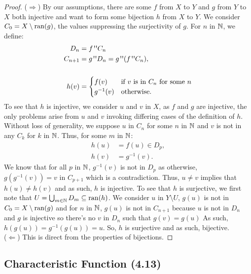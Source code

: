 \begin{proof}
    ($\Longrightarrow$) By our assumptions, there are some 
    $f$ from $X$ to $Y$ and $g$ from $Y$ to $X$ both
    injective and want to form some bijection $h$ from $X$ to $Y$.
    We consider $C_0 = X \setminus \operatorname{ran}(g)$, the values suppressing
    the surjectivity of $g$. For $n$ in $\mathbb{N}$, we define: \begin{align*}
        D_{n}     &= f \fran C_n \\
        C_{n + 1} &= g \fran D_n = g \fran (f \fran C_n), \\
        \\
        h(v) &= \begin{cases}
            f(v) & \text{if $v$ is in $C_n$ for some $n$} \\
            g^{-1}(v) & \text{otherwise.}
        \end{cases}
    \end{align*} To see that $h$ is injective, we consider $u$ and $v$ in
    $X$, as $f$ and $g$ are injective, the only problems arise from
    $u$ and $v$ invoking differing cases of the definition of $h$.
    Without loss of generality, we suppose $u$ in $C_n$ for some $n$ in $\mathbb{N}$
    and $v$ is not in any $C_k$ for $k$ in $\mathbb{N}$. Thus, for some
    $m$ in $\mathbb{N}$: \begin{align*}
        h(u) &= f(u) \in D_p, \\
        h(v) &= g^{-1}(v).
    \end{align*} We know that for all $p$ in $\mathbb{N}$, $g^{-1}(v)$ is not in $D_p$ 
    as otherwise, $g(g^{-1}(v)) = v$ in $C_{p + 1}$ which is a contradiction. 
    Thus, $u \neq v$ implies that $h(u) \neq h(v)$ and as such, $h$ is injective. 
    To see that $h$ is
    surjective, we first note that $U = \bigcup_{m \in \mathbb{N}} D_m \subseteq \operatorname{ran}(h)$.
    We consider $u$ in $Y \setminus U$, $g(u)$ is not in $C_0 = X \setminus \operatorname{ran}(g)$
    and for $n$ in $\mathbb{N}$, $g(u)$ is not in $C_{n + 1}$ because $u$ is not in 
    $D_n$ and $g$ is injective so there's no $v$ in $D_n$ such that $g(v) = g(u)$ 
    As such, $h(g(u)) = g^{-1}(g(u)) = u$. So, $h$ is surjective and as such, bijective.
    \\[\baselineskip]
    ($\Longleftarrow$) This is direct from the properties of bijections.
\end{proof}

\subsection{Characteristic Function (4.13)} \label{4.13}

